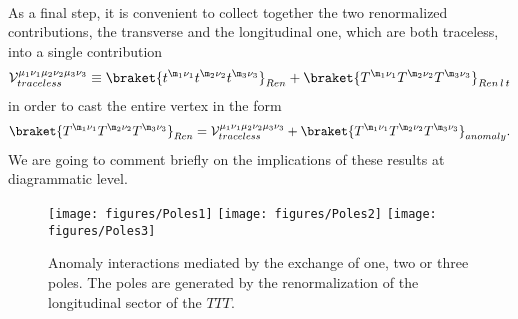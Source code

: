 \documentclass[a4paper,11pt,openright,twoside]{book}
\let\n=\nu      \let\x=\xi     \let\p=\pi      \let\r=\rho
\numberwithin{equation}{section}
\begin{document}
{{\begin{align}
\end{align}
As a final step, it is convenient to collect together the two renormalized contributions, the transverse and the longitudinal one, which are both traceless, into a single contribution 
\begin{align}
	\mathcal{V}^{\mu_1\nu_1\mu_2\nu_2\mu_3\nu_3}_{ traceless}\equiv \braket{t^{\m_1\n_1} t^{\m_2\n_2} t^{\m_3\n_3}}_{Ren} + \braket{ T^{\m_1\n_1}T^{\m_2\n_2}T^{\m_3\n_3}}_{Ren\,l \, t}
\end{align}
in order to cast the entire vertex in the form 
\begin{align}
	\braket{T^{\m_1\n_1}T^{\m_2\n_2}T^{\m_3\n_3}}_{Ren}=\mathcal{V}^{\mu_1\nu_1\mu_2\nu_2\mu_3\nu_3}_{traceless} + 
	\braket{T^{\m_1\n_1}T^{\m_2\n_2}T^{\m_3\n_3}}_{anomaly}.
\end{align}
We are going to comment briefly on the implications of these results at diagrammatic level.

\begin{figure}[t]
	\centering
	\vspace{2ex}
	\texttt{[image: figures/Poles1]}\hspace{1ex}
	\texttt{[image: figures/Poles2]}\hspace{1ex}
	\texttt{[image: figures/Poles3]}
	\vspace{2ex}
	\caption{Anomaly interactions mediated by the exchange of one, two or three poles. The poles are generated by the renormalization of the longitudinal sector of the $TTT$.}
	\label{dec}
\end{figure}

}}
\end{document}
